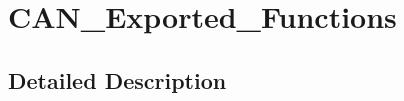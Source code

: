 \hypertarget{group___c_a_n___exported___functions}{\section{C\-A\-N\-\_\-\-Exported\-\_\-\-Functions}
\label{group___c_a_n___exported___functions}
}


\subsection{Detailed Description}

